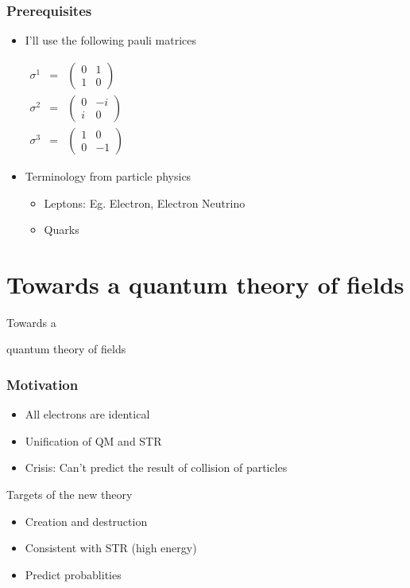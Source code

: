 \documentclass{beamer}
\begin{document}
\begin{frame}
	\frametitle{Prerequisites}
		\begin{itemize}
			\item I'll use the following pauli matrices

			$\begin{aligned}\sigma^{1} & = & \left(\begin{array}{cc}
			0 & 1\\
			1 & 0
			\end{array}\right)\\
			\sigma^{2} & = & \left(\begin{array}{cc}
			0 & -i\\
			i & 0
			\end{array}\right)\\
			\sigma^{3} & = & \left(\begin{array}{cc}
			1 & 0\\
			0 & -1
			\end{array}\right)
			\end{aligned}
			 $
 			\item Terminology from particle physics
 			\begin{itemize}
 				\item Leptons: Eg. Electron, Electron Neutrino
 				\item Quarks
 			\end{itemize}

		\end{itemize}
\end{frame}

\section{Towards a quantum theory of fields}
\begin{frame}	
	\Huge{\centerline{Towards a}}
	\Huge{\centerline{quantum theory of fields}}
\end{frame}

\begin{frame}
	\frametitle{Motivation}
		\begin{itemize}	
			\item All electrons are identical
			\pause
			\item Unification of QM and STR
			\pause
			\item Crisis: Can't predict the result of collision of particles
		\end{itemize}
		\pause
		Targets of the new theory
		\begin{itemize}
			\item Creation and destruction
			\pause
			\item Consistent with STR (high energy)
			\pause
			\item Predict probablities			
		\end{itemize}
\end{frame}
\end{document}
